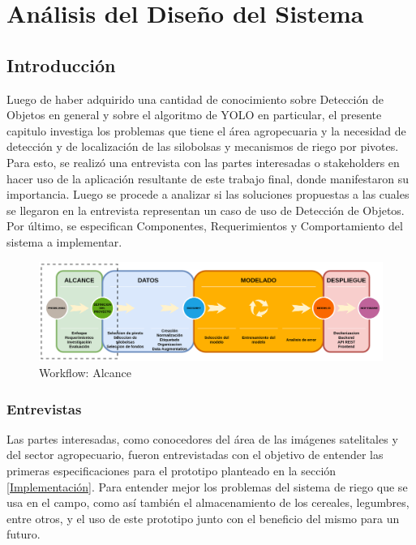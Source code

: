 \chapter{Análisis del Diseño del Sistema}
\label{Análisis del Diseño del Sistema}

\section{Introducción}
Luego de haber adquirido una cantidad de conocimiento sobre Detección de Objetos en general y sobre el algoritmo de YOLO en particular, el presente capitulo 
investiga los problemas que tiene el área agropecuaria y la necesidad de detección y de localización de las silobolsas y mecanismos de riego por pivotes. Para esto, se realizó una entrevista con las partes interesadas o stakeholders en hacer uso de la aplicación resultante de este trabajo final, donde manifestaron su importancia. Luego se procede a analizar si las soluciones propuestas a las cuales se llegaron en la entrevista representan un caso de uso de Detección de Objetos. Por último, se especifican Componentes, Requerimientos y Comportamiento del sistema a implementar.
\begin{figure}[h!]
    \centering
    \includegraphics[width=1.2\textwidth,center]{img/Wokflow - alcance.drawio.png}
    \caption{Workflow: Alcance}
    \label{fig:workflow - alcance}
\end{figure}

\subsection{Entrevistas}

Las partes interesadas, como conocedores del área de las imágenes satelitales y del sector agropecuario, fueron entrevistadas con el objetivo de entender las primeras especificaciones para el prototipo planteado en la sección \ref{Implementación}. Para entender mejor los problemas del sistema de riego que se usa en el campo, como así también el almacenamiento de los cereales, legumbres, entre otros, y el uso de este prototipo junto con el beneficio del mismo para un futuro.

